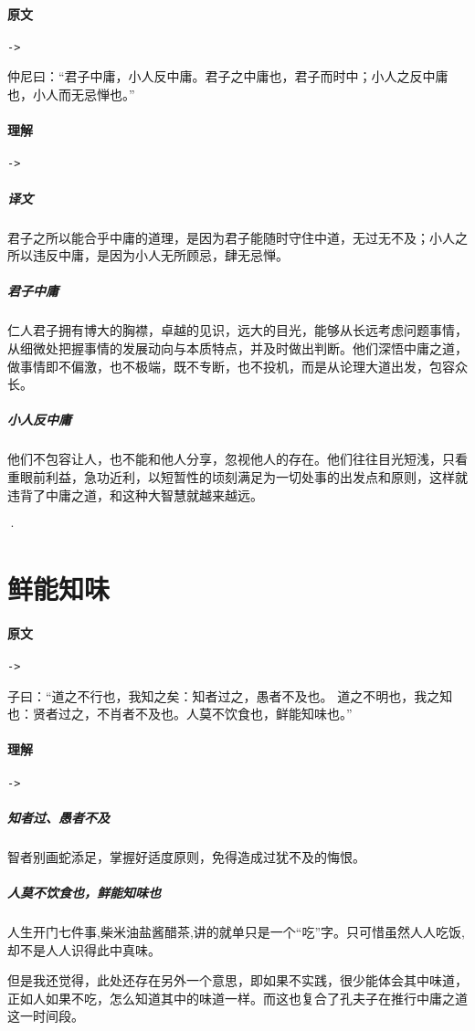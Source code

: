 \documentclass[UTF8,a4paper,8pt]{ctexbook}
\begin{document}
			\paragraph{原文}\verb|->|
				
				仲尼曰：“君子中庸，小人反中庸。君子之中庸也，君子而时中；小人之反中庸也，小人而无忌惮也。”
				
			\paragraph{理解}\verb|->|
				\subparagraph{译文}君子之所以能合乎中庸的道理，是因为君子能随时守住中道，无过无不及；小人之所以违反中庸，是因为小人无所顾忌，肆无忌惮。

				\subparagraph{君子中庸}仁人君子拥有博大的胸襟，卓越的见识，远大的目光，能够从长远考虑问题事情，从细微处把握事情的发展动向与本质特点，并及时做出判断。他们深悟中庸之道，做事情即不偏激，也不极端，既不专断，也不投机，而是从论理大道出发，包容众长。
				
				\subparagraph{小人反中庸}他们不包容让人，也不能和他人分享，忽视他人的存在。他们往往目光短浅，只看重眼前利益，急功近利，以短暂性的顷刻满足为一切处事的出发点和原则，这样就违背了中庸之道，和这种大智慧就越来越远。
				
·		\section{鲜能知味}
			\paragraph{原文}\verb|->|
				
				子曰：“道之不行也，我知之矣：知者过之，愚者不及也。 道之不明也，我之知也：贤者过之，不肖者不及也。人莫不饮食也，鲜能知味也。”
				
			\paragraph{理解}\verb|->|
			
				\subparagraph{知者过、愚者不及}智者别画蛇添足，掌握好适度原则，免得造成过犹不及的悔恨。
				
				\subparagraph{人莫不饮食也，鲜能知味也} 人生开门七件事,柴米油盐酱醋茶,讲的就单只是一个“吃”字。只可惜虽然人人吃饭,却不是人人识得此中真味。
				
				但是我还觉得，此处还存在另外一个意思，即如果不实践，很少能体会其中味道，正如人如果不吃，怎么知道其中的味道一样。而这也复合了孔夫子在推行中庸之道这一时间段。
	
\end{document}
